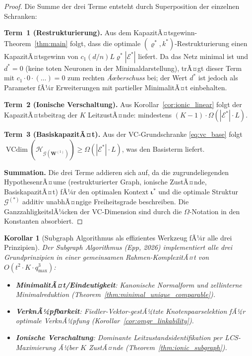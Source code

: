 ﻿\documentclass[12pt, a4paper, openany]{report}
\newtheorem{corollary}[theorem]{Korollar}
\newcommand{\calG}{\mathcal{G}}
\newcommand{\calH}{\mathcal{H}}
\newcommand{\calE}{\mathcal{E}}
\DeclareMathOperator{\VC}{VCdim}
\begin{document}
\begin{proof}
Die Summe der drei Terme entsteht durch Superposition der einzelnen Schranken:

\textbf{Term~1 (Restrukturierung).}
Aus dem KapazitÃ¤tsgewinn-Theorem~\ref{thm:main} folgt, dass die optimale
$(\varrho^*, k^*)$-Restrukturierung einen KapazitÃ¤tsgewinn von
$c_1 (d/n) L \varrho^* |\calE^*|$ liefert.  Da das Netz minimal ist und
$d^* = 0$ (keine toten Neuronen in der Minimaldarstellung), trÃ¤gt dieser
Term mit $c_1 \cdot 0 \cdot(\ldots) = 0$ zum rechten \emph{Ãœberschuss}
bei; der Wert $d^*$ ist jedoch als Parameter fÃ¼r Erweiterungen mit
partieller MinimalitÃ¤t einbehalten.

\textbf{Term~2 (Ionische Verschaltung).}
Aus Korollar~\ref{cor:ionic_linear} folgt der KapazitÃ¤tsbeitrag der
$K$ LeitzustÃ¤nde: mindestens $(K-1) \cdot \Omega(|\calE^*| \cdot L)$.

\textbf{Term~3 (BasiskapazitÃ¤t).}
Aus der VC-Grundschranke \eqref{eq:vc_base} folgt $\VC(\calH_{\calG(\bm{W}^{(1)})})
\geq \Omega(|\calE^*| \cdot L)$, was den Basisterm liefert.

\textbf{Summation.}
Die drei Terme addieren sich auf, da die zugrundeliegenden
HypothesenrÃ¤ume (restrukturierter Graph, ionische ZustÃ¤nde, BasiskapazitÃ¤t)
fÃ¼r den optimalen Kontext $\bm{\iota}^*$ und die optimale Struktur
$\calG^{(*)}$ additiv unabhÃ¤ngige Freiheitsgrade beschreiben.
Die GanzzahligkeitslÃ¼cken der VC-Dimension sind durch die $\Omega$-Notation
in den Konstanten absorbiert.
\end{proof}

\begin{corollary}[Subgraph Algorithmus als effizientes Werkzeug fÃ¼r alle drei Prinzipien]
\label{cor:subgraph_three_principles}
Der Subgraph Algorithmus (Epp, 2026) implementiert alle drei Grundprinzipien
in einer gemeinsamen Rahmen-KomplexitÃ¤t von $O(t^2 \cdot K \cdot q_{\max}^3)$:
\begin{itemize}
  \item \textbf{MinimalitÃ¤t/Eindeutigkeit}: Kanonische Normalform und
    zellinterne Minimalreduktion (Theorem~\ref{thm:minimal_unique_comparable}).
  \item \textbf{VerknÃ¼pfbarkeit}: Fiedler-Vektor-gestÃ¼tzte Knotenpaarselektion
    fÃ¼r optimale VerknÃ¼pfung (Korollar~\ref{cor:omgr_linkability}).
  \item \textbf{Ionische Verschaltung}: Dominante Leitzustandsidentifikation
    per LCS-Maximie\-rung Ã¼ber $K$ ZustÃ¤nde
    (Theorem~\ref{thm:ionic_subgraph}).
\end{itemize}
\end{corollary}
\end{document}
